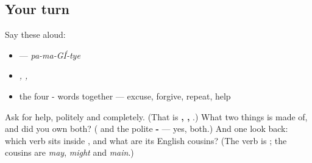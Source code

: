 \subsection*{Your turn}
Say these aloud:

\begin{itemize}
\raggedright
  \item \emph{} — \emph{pa-ma-GÍ-tye}
  \item \emph{, , }
  \item the four - words together — excuse, forgive, repeat, help
\end{itemize}

\begin{tcolorbox}[breakable,colback=teal!4,colframe=teal!35!black,title={Before you move on}]
Ask for help, politely and completely. (That is \textbf{, , }.) What two things is \textbf{} made of, and did you own both? (\textbf{} and the polite \textbf{-} — yes, both.) And one look back: which verb sits inside \textbf{}, and what are its English cousins? (The verb is \textbf{}; the cousins are \emph{may}, \emph{might} and \emph{main}.)
\end{tcolorbox}
